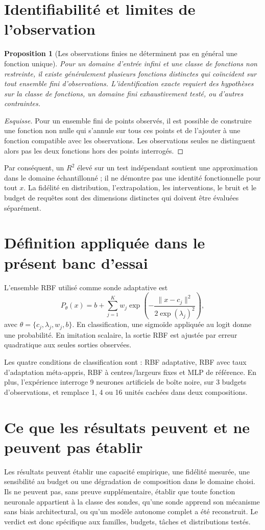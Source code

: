 \documentclass[11pt,a4paper]{article}
\newtheorem{proposition}{Proposition}
\begin{document}
\section{Identifiabilité et limites de l'observation}
\begin{proposition}[Les observations finies ne déterminent pas en général une fonction unique]
Pour un domaine d'entrée infini et une classe de fonctions non restreinte, il existe généralement plusieurs fonctions distinctes qui coïncident sur tout ensemble fini d'observations. L'identification exacte requiert des hypothèses sur la classe de fonctions, un domaine fini exhaustivement testé, ou d'autres contraintes.
\end{proposition}
\begin{proof}[Esquisse]
Pour un ensemble fini de points observés, il est possible de construire une fonction non nulle qui s'annule sur tous ces points et de l'ajouter à une fonction compatible avec les observations. Les observations seules ne distinguent alors pas les deux fonctions hors des points interrogés.
\end{proof}

Par conséquent, un $R^2$ élevé sur un test indépendant soutient une approximation dans le domaine échantillonné ; il ne démontre pas une identité fonctionnelle pour tout $x$. La fidélité en distribution, l'extrapolation, les interventions, le bruit et le budget de requêtes sont des dimensions distinctes qui doivent être évaluées séparément.

\section{Définition appliquée dans le présent banc d'essai}
L'ensemble RBF utilisé comme sonde adaptative est
\[
 P_{\theta}(x)=b+\sum_{j=1}^{K}w_j\exp\!\left(-\frac{\|x-c_j\|^2}{2\exp(\lambda_j)^2}\right),
\]
avec $\theta=\{c_j,\lambda_j,w_j,b\}$. En classification, une sigmoïde appliquée au logit donne une probabilité. En imitation scalaire, la sortie RBF est ajustée par erreur quadratique aux seules sorties observées.

Les quatre conditions de classification sont : RBF adaptative, RBF avec taux d'adaptation méta-appris, RBF à centres/largeurs fixes et MLP de référence. En plus, l'expérience interroge 9 neurones artificiels de boîte noire, sur 3 budgets d'observations, et remplace 1, 4 ou 16 unités cachées dans deux compositions.

\section{Ce que les résultats peuvent et ne peuvent pas établir}
Les résultats peuvent établir une capacité empirique, une fidélité mesurée, une sensibilité au budget ou une dégradation de composition dans le domaine choisi. Ils ne peuvent pas, sans preuve supplémentaire, établir que toute fonction neuronale appartient à la classe des sondes, qu'une sonde apprend son mécanisme sans biais architectural, ou qu'un modèle autonome complet a été reconstruit. Le verdict est donc spécifique aux familles, budgets, tâches et distributions testés.
\end{document}
